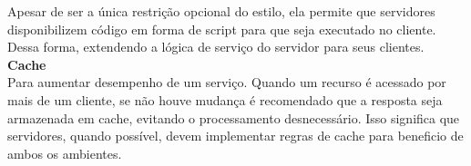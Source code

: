 Apesar de ser a única restrição opcional do estilo, ela permite que servidores disponibilizem código em forma de script para que seja executado no cliente. Dessa forma, extendendo a lógica de serviço do servidor para seus clientes. \cite{Fielding2000} \\

\textbf{Cache} \\

Para aumentar desempenho de um serviço. Quando um recurso é acessado por mais de um cliente, se não houve mudança é recomendado que a resposta seja armazenada em cache, evitando o processamento desnecessário. Isso significa que servidores, quando possível, devem implementar regras de cache para beneficio de ambos os ambientes. \cite{Fielding2000}
